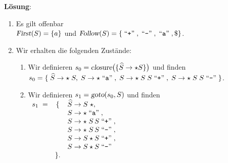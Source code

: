\documentclass{article}
\newcommand{\solution}{
\vspace*{0.3cm}

\noindent
\textbf{L\"osung}: }
\newcommand{\quoted}[1]{\;\mbox{``\texttt{#1}''}\;}
\begin{document}
\solution
\begin{enumerate}
\item Es gilt offenbar
      \\[0.2cm]
      \hspace*{1.3cm}
      $\textsl{First}(S) = \{ a \}$ \quad und \quad
      $\textsl{Follow}(S) = \{ \quoted{+}, \quoted{-}, \quoted{a}, \symbol{36} \}$.
\item Wir erhalten die folgenden Zust\"ande:
      \begin{enumerate}
      \item Wir definieren $s_0 = \textsl{closure}\bigl(\{\widehat{S} \rightarrow \star S\}\bigr)$ und 
            finden
            \\[0.2cm]
            \hspace*{1.3cm}
            $s_0 = \{\; \widehat{S} \rightarrow \star\; S,\;
                      S \rightarrow \star \quoted{a},\; 
                      S \rightarrow \star \; S\; S \quoted{+},\; 
                      S \rightarrow \star \; S\; S \quoted{-}
            \}$.
      \item Wir definieren $s_1 = \textsl{goto}(s_0, S)$ und finden
            \\[0.2cm]
            \hspace*{1.3cm}
            $
            \begin{array}[t]{lcl}
            s_1 \;= & \{ & \widehat{S} \rightarrow S\; \star,             \\
                    &    & S \rightarrow \star \quoted{a},                \\
                    &    & S \rightarrow \star\; S\, S \quoted{+},        \\
                    &    & S \rightarrow \star\; S\, S \quoted{-},        \\
                    &    & S \rightarrow S \star S \quoted{+},            \\
                    &    & S \rightarrow S \star S \quoted{-}\;           \\
                    & \}.
            \end{array}
            $


\end{enumerate}
\end{enumerate}
\end{document}
